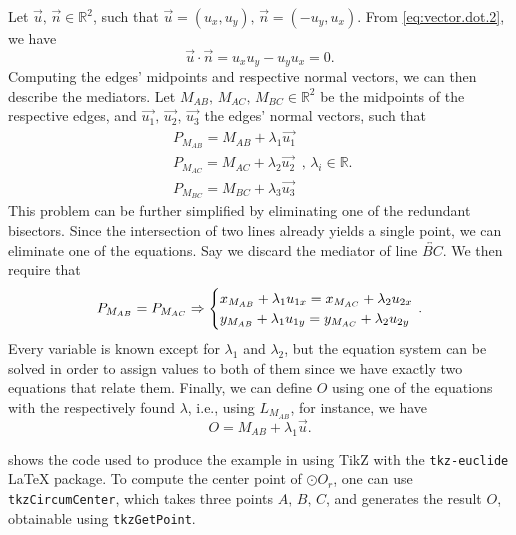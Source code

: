 %
Let $\vec{u},\,\vec{n} \in \mathbb{R}^2$, such that $\vec{u} = (u_x,
u_y),\,\vec{n} = (-u_y, u_x)$.  From \eqref{eq:vector.dot.2}, we have
\[ \vec{u} \cdot \vec{n} = u_x u_y - u_y u_x = 0.  \]
%
Computing the edges' midpoints and respective normal vectors, we can then
describe the mediators.  Let $M_{AB},\,M_{AC},\,M_{BC} \in \mathbb{R}^2$ be the
midpoints of the respective edges, and $\vec{u_1},\,\vec{u_2},\,\vec{u_3}$ the
edges' normal vectors, such that
\[
  \begin{split}
    P_{M_{AB}} = M_{AB} + \lambda_1 \vec{u_1}\\
    P_{M_{AC}} = M_{AC} + \lambda_2 \vec{u_2}\\
    P_{M_{BC}} = M_{BC} + \lambda_3 \vec{u_3}
  \end{split}
  ,\,\lambda_i \in \mathbb{R}.
\]
This problem can be further simplified by eliminating one of the redundant
bisectors.  Since the intersection of two lines already yields a single point,
we can eliminate one of the equations.  Say we discard the mediator of line
$\overleftrightarrow{BC}$.  We then require that
\[
  P_{M_{AB}} = P_{M_{AC}} \Rightarrow \begin{cases}
    x_{M_{AB}} + \lambda_1 u_{1x} = x_{M_{AC}} + \lambda_2 u_{2x} \\
    y_{M_{AB}} + \lambda_1 u_{1y} = y_{M_{AC}} + \lambda_2 u_{2y}
  \end{cases}{\hskip -2ex}.
\]
Every variable is known except for $\lambda_1$ and $\lambda_2$, but the equation
system can be solved in order to assign values to both of them since we have
exactly two equations that relate them.  Finally, we can define $O$ using one of
the equations with the respectively found $\lambda$, i.e., using $L_{M_{AB}}$,
for instance, we have
\[
  O = M_{AB} + \lambda_1 \vec{u}.
\]

 shows the code used to produce the
example in  using \acs{TikZ} with the
\texttt{tkz-euclide} \LaTeX{} package.  To compute the center point of $\odot
O_r$, one can use \texttt{tkzCircumCenter}, which takes three points
$A,\,B,\,C$, and generates the result $O$, obtainable using
\texttt{tkzGetPoint}.

\begin{listing}[htbp]
  \inputminted[highlightlines=3]{latex}{tikz/ex-circumcenter.tex}
  \caption[Circumcenter example from 
      using \acs{TikZ}]{%
    Circumcenter example from  using
    \acs{TikZ} alongside \texttt{tkz-euclide}.  The highlighted line shows how
    to obtain the center of $\odot O_r$ via the non-degenerate triangle
    $\triangle ABC$.}
  \label{lst:intro.example.circumcenter.tikz}
\end{listing}

